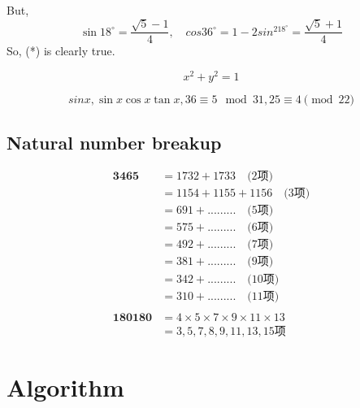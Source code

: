 \documentclass[11pt,a4paper]{article}
\begin{document}
But,
$$\sin18^{\circ}=\frac{\sqrt{5}-1}{4},\quad cos36^{\circ}=1-2sin^218^{\circ}=\frac{\sqrt{5}+1}{4}$$
So, (*) is clearly true.

\begin{equation}
x^2 + y^2 = 1
\end{equation}

\[ sinx, \sin x\cos x \tan x, 36\equiv5\mod{31}, 25\equiv4\pmod{22} \]

\subsection{Natural number breakup}

\begin{CJK}{UTF8}{gbsn}
	
\begin{eqnarray*}
\textbf{3465} & =1732+1733 \quad \text{(2项)} \\
     & =1154+1155+1156 \quad \text{(3项)} \\
     & =691 +......... \quad \text{(5项)} \\
     & =575 +.........  \quad \text{(6项)} \\
     & =492 +.........  \quad \text{(7项)} \\
     & =381 +.........  \quad \text{(9项)} \\
     & =342 +.........  \quad \text{(10项)} \\
     & =310 +.........  \quad \text{(11项)} \\     
\\
\textbf{180180} & = 4 \times 5 \times 7 \times 9 \times 11 \times 13 \\
	& = 3,5,7,8,9,11,13,15 \text{项}
\end{eqnarray*}

\end{CJK}
\newpage
\section{Algorithm}
\end{document}
